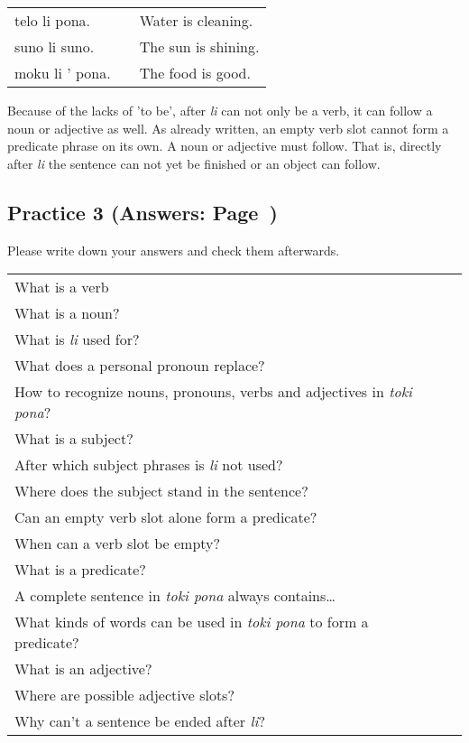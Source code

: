 \begin{supertabular}{p{5cm}|ll}
telo li pona. && Water is cleaning. \\
suno li suno. && The sun is shining. \\
moku li ' pona. && The food is good. \\ 
\end{supertabular} 

Because of the lacks of 'to be', after \textit{li} can not only be a verb, it can follow a noun or adjective as well. 
As already written, an empty verb slot cannot form a predicate phrase on its own. 
A noun or adjective must follow. 
That is, directly after \textit{li} the sentence can not yet be finished or an object can follow.
%
\newpage
\subsection*{Practice 3 (Answers: Page~\pageref{'basic_sentences'})}
%

Please write down your answers and check them afterwards. 

\begin{supertabular}{p{5cm}|ll}
What is a verb &&  \\ %
What is a noun? &&   \\ %
What is \textit{li} used for?  &&   \\ %
What does a personal pronoun replace? &&  \\ %
How to recognize nouns, pronouns, verbs and adjectives in \textit{toki pona}? &&  \\ %
What is a subject?  &&   \\ %
After which subject phrases is \textit{li} not used?  &&  \\ %
Where does the subject stand in the sentence?  &&    \\ %
Can an empty verb slot alone form a predicate? &&    \\ %
When can a verb slot be empty?  &&     \\ %
What is a predicate?  &&     \\ %
A complete sentence in \textit{toki pona} always contains\dots  &&     \\ %
What kinds of words can be used in \textit{toki pona} to form a predicate? &&   \\ %
What is an adjective?  &&    \\ %
Where are possible adjective slots?  &&    \\  %
Why can't a sentence be ended after \textit{li}? &&  \\ %
\end{supertabular} 

